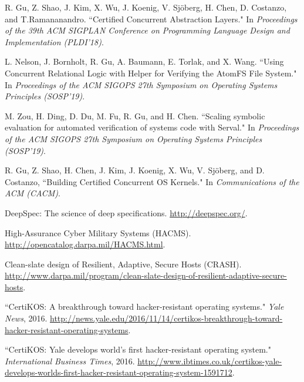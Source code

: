 \documentclass[a4paper, 10pt]{article}
\begin{document}
\begin{footnotesize}
\begin{thebibliography}{}
R. Gu, Z. Shao, J. Kim, X. Wu, J. Koenig, V. Sj\"{o}berg, H. Chen, D. Costanzo, and T.Ramananandro. ``Certified Concurrent Abstraction Layers." In \emph{Proceedings of the  39th ACM SIGPLAN Conference on Programming Language Design and Implementation (PLDI'18)}.

L. Nelson, J. Bornholt, R. Gu, A. Baumann, E. Torlak, and X. Wang. ``Using Concurrent Relational Logic with Helper for Verifying the AtomFS File System." In \emph{Proceedings of the  ACM SIGOPS 27th Symposium on Operating Systems Principles  (SOSP'19)}.


M. Zou, H. Ding, D. Du, M. Fu, R. Gu, and H. Chen. ``Scaling symbolic evaluation for automated verification of systems code with Serval." In \emph{Proceedings of the  ACM SIGOPS 27th Symposium on Operating Systems Principles  (SOSP'19)}.

R. Gu, Z. Shao, H. Chen, J. Kim, J. Koenig, X. Wu, V. Sj\"{o}berg, and D. Costanzo, ``Building Certified Concurrent OS Kernels." In \emph{Communications of the ACM (CACM)}.







DeepSpec: The science of deep specifications. 
\url{http://deepspec.org/}.

High-Assurance Cyber Military Systems (HACMS). 
\url{http://opencatalog.darpa.mil/HACMS.html}.

Clean-slate design of Resilient, Adaptive, Secure Hosts (CRASH). 
\url{http://www.darpa.mil/program/clean-slate-design-of-resilient-adaptive-secure-hosts}.

``CertiKOS: A breakthrough toward hacker-resistant operating systems." \emph{Yale News}, 2016.
\url{http://news.yale.edu/2016/11/14/certikos-breakthrough-toward-hacker-resistant-operating-systems}.

``CertiKOS: Yale develops world's first hacker-resistant operating system." \emph{International Business Times}, 2016.
\url{http://www.ibtimes.co.uk/certikos-yale-develops-worlds-first-hacker-resistant-operating-system-1591712}.


\end{thebibliography}
\end{footnotesize}
\end{document}
